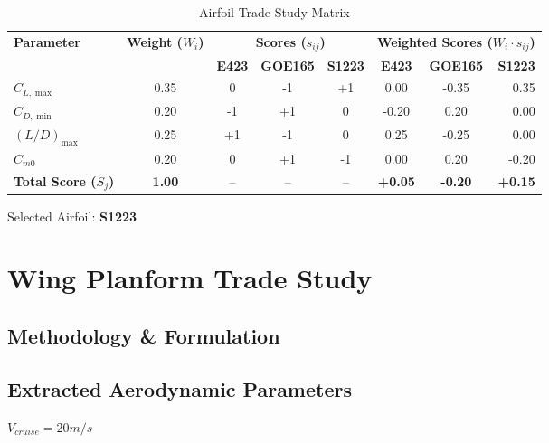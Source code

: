 \documentclass[11pt,a4paper]{article}
\begin{document}
\begin{table}[H]
\centering
\caption{Airfoil Trade Study Matrix}
\label{tab:airfoil_trade_matrix}
\begin{tabular}{lccccccr}
\toprule
\multirow{2}{*}{\textbf{Parameter}} & \multirow{2}{*}{\textbf{Weight ($W_i$)}} & \multicolumn{3}{c}{\textbf{Scores ($s_{ij}$)}} & \multicolumn{3}{c}{\textbf{Weighted Scores ($W_i \cdot s_{ij}$)}} \\
\cmidrule(lr){3-5} \cmidrule(lr){6-8}
& & \textbf{E423} & \textbf{GOE165} & \textbf{S1223} & \textbf{E423} & \textbf{GOE165} & \textbf{S1223} \\
\midrule
$C_{L,\max}$   & 0.35 & 0  & -1 & +1 & 0.00  & -0.35 & 0.35 \\
$C_{D,\min}$   & 0.20 & -1 & +1 & 0  & -0.20 & 0.20  & 0.00 \\
$(L/D)_{\max}$ & 0.25 & +1 & -1 & 0  & 0.25  & -0.25 & 0.00 \\
$C_{m0}$       & 0.20 & 0  & +1 & -1 & 0.00  & 0.20  & -0.20 \\
\midrule
\textbf{Total Score ($S_j$)} & \textbf{1.00} & -- & -- & -- & \textbf{+0.05} & \textbf{-0.20} & \textbf{+0.15} \\
\bottomrule
\end{tabular}
\end{table}


Selected Airfoil: \textbf{S1223}

\section{Wing Planform Trade Study}

\subsection{Methodology \& Formulation}

\subsection{Extracted Aerodynamic Parameters}
$V_{cruise} = 20 m/s$
\end{document}
